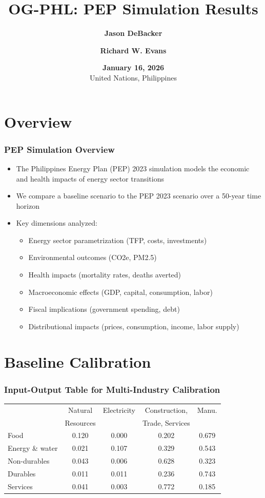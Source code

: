 \documentclass{beamer}
\title[OG-PHL PEP Simulation]{OG-PHL: PEP Simulation Results}
\author[DeBacker and Evans]{\textbf{Jason DeBacker} \inst{1} \and \textbf{Richard W. Evans} \inst{2}}
\institute[shortinst]{\inst{1} University of South Carolina, Department of Economics \and
\inst{2} Abundance Institute, Open Research Group, Inc.}
\date[Short Occasion]{\textbf{January 16, 2026} \\ United Nations, Philippines}
\begin{document}
\begin{frame}
  \titlepage
\end{frame}


\section{Overview}

\begin{frame}
  \frametitle{PEP Simulation Overview}

  \begin{itemize}
    \item The Philippines Energy Plan (PEP) 2023 simulation models the economic and health impacts of energy sector transitions
    \item We compare a baseline scenario to the PEP 2023 scenario over a 50-year time horizon
    \item Key dimensions analyzed:
      \begin{itemize}
        \item Energy sector parametrization (TFP, costs, investments)
        \item Environmental outcomes (CO2e, PM2.5)
        \item Health impacts (mortality rates, deaths averted)
        \item Macroeconomic effects (GDP, capital, consumption, labor)
        \item Fiscal implications (government spending, debt)
        \item Distributional impacts (prices, consumption, income, labor supply)
      \end{itemize}
  \end{itemize}
\end{frame}


\section{Baseline Calibration}

\begin{frame}
  \frametitle{Input-Output Table for Multi-Industry Calibration}

  \begin{table}
    \small
\label{tab:PEP_IO_Table}
\begin{tabular}{lcccc}
\hline
\hline
 & Natural & Electricity & Construction, & Manu. \\
  & Resources &  & Trade, Services &  \\
\hline
Food & 0.120 & 0.000 & 0.202 & 0.679 \\
Energy \& water & 0.021 & 0.107 & 0.329 & 0.543 \\
Non-durables & 0.043 & 0.006 & 0.628 & 0.323 \\
Durables & 0.011 & 0.011 & 0.236 & 0.743 \\
Services & 0.041 & 0.003 & 0.772 & 0.185 \\
\hline
\hline
\end{tabular}
\end{table}

\end{frame}
\end{document}
